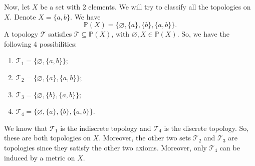 \documentclass[a4paper, openany]{memoir}
\theoremstyle{definition}
\theoremstyle{plain}
\begin{document}
Now, let $X$ be a set with 2 elements. We will try to classify all the topologies on $X$. Denote $X = \{a, b\}$. We have
\[\mathbb{P}(X) = \{\varnothing, \{a\}, \{b\}, \{a, b\}\}.\]
A topology $\mathcal{T}$ satisfies $\mathcal{T} \subseteq \mathbb{P}(X)$, with $\varnothing , X \in \mathbb{P}(X)$. So, we have the following 4 possibilities:
\begin{enumerate}
    \item $\mathcal{T}_1 = \{\varnothing, \{a, b\}\}$;
    \item $\mathcal{T}_2 = \{\varnothing, \{a\}, \{a, b\}\}$;
    \item $\mathcal{T}_3 = \{\varnothing, \{b\}, \{a, b\}\}$;
    \item $\mathcal{T}_4 = \{\varnothing, \{a\}, \{b\}, \{a, b\}\}$.
\end{enumerate}
We know that $\mathcal{T}_1$ is the indiscrete topology and $\mathcal{T}_4$ is the discrete topology. So, these are both topologies on $X$. Moreover, the other two sets $\mathcal{T}_2$ and $\mathcal{T}_3$ are topologies since they satisfy the other two axioms. Moreover, only $\mathcal{T}_4$ can be induced by a metric on $X$. 
\newpage
\end{document}
